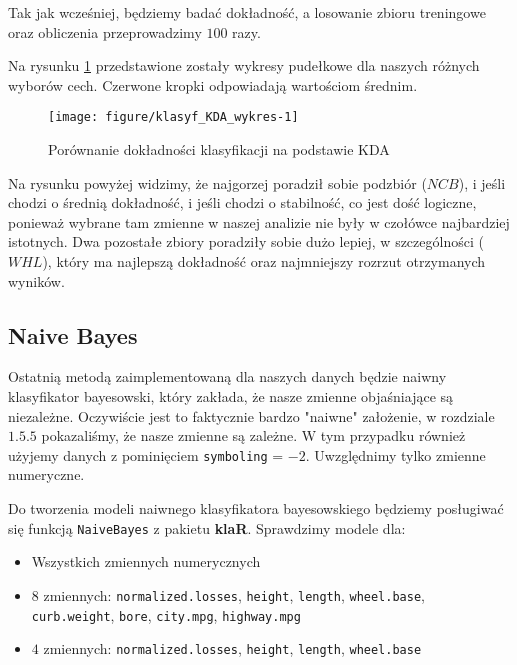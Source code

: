 \documentclass[12pt, a4paper]{article}\usepackage[]{graphicx}\usepackage[]{xcolor}
\makeatletter
\def\maxwidth{ %
  \ifdim\Gin@nat@width>\linewidth
    \linewidth
  \else
    \Gin@nat@width
  \fi
}
\newenvironment{knitrout}{}{} %
\makeatother
\begin{document}
\par
Tak jak wcześniej, będziemy badać dokładność, a losowanie zbioru treningowe oraz obliczenia przeprowadzimy $100$ razy. 
\par Na rysunku \ref{fig:klasyf_KDA_wykres} przedstawione zostały wykresy pudełkowe dla naszych różnych wyborów cech. Czerwone kropki odpowiadają wartościom średnim.



\begin{knitrout}
\color{fgcolor}\begin{figure}[H]

{\centering \texttt{[image: figure/klasyf\_KDA\_wykres-1]} 

}

\caption[Porównanie dokładności klasyfikacji na podstawie KDA]{Porównanie dokładności klasyfikacji na podstawie KDA}\label{fig:klasyf_KDA_wykres}
\end{figure}

\end{knitrout}

Na rysunku powyżej widzimy, że najgorzej poradził sobie podzbiór ($NCB$), i jeśli chodzi o średnią dokładność, i jeśli chodzi o stabilność, co jest dość logiczne, ponieważ wybrane tam zmienne w naszej analizie nie były w czołówce najbardziej istotnych. Dwa pozostałe zbiory poradziły sobie dużo lepiej, w szczególności ($WHL$), który ma najlepszą dokładność oraz najmniejszy rozrzut otrzymanych wyników.


\subsection{Naive Bayes}

Ostatnią metodą zaimplementowaną dla naszych danych będzie naiwny klasyfikator bayesowski, który zakłada, 
że nasze zmienne objaśniające są niezależne. Oczywiście jest to faktycznie bardzo "naiwne" założenie, w rozdziale $1.5.5$ pokazaliśmy, że nasze zmienne są zależne. W tym przypadku również użyjemy danych z pominięciem \texttt{symboling} = $-2$.
Uwzględnimy tylko zmienne numeryczne.

\par

Do tworzenia modeli naiwnego klasyfikatora bayesowskiego będziemy posługiwać się funkcją \texttt{NaiveBayes} z pakietu \textbf{klaR}. Sprawdzimy modele dla:
\begin{itemize}
\item Wszystkich zmiennych numerycznych
\item $8$ zmiennych: \texttt{normalized.losses}, \texttt{height}, \texttt{length}, \texttt{wheel.base}, \texttt{curb.weight}, \texttt{bore}, \texttt{city.mpg}, \texttt{highway.mpg}
\item $4$ zmiennych: \texttt{normalized.losses}, \texttt{height}, \texttt{length}, \texttt{wheel.base}
\end{itemize}
\end{document}
